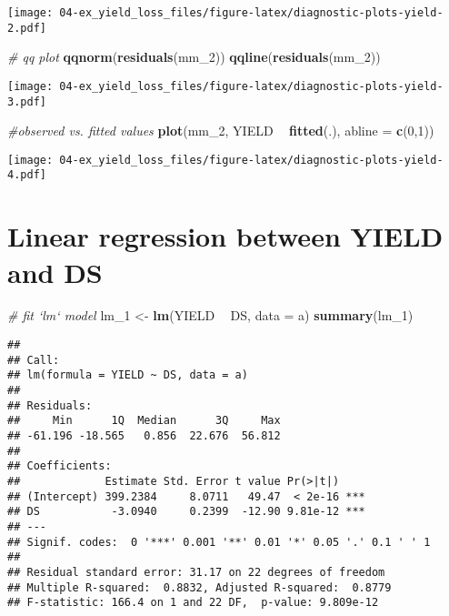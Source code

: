 \documentclass[]{book}
\newenvironment{Shaded}{\begin{snugshade}}{\end{snugshade}}
\newcommand{\CommentTok}[1]{\textcolor[rgb]{0.56,0.35,0.01}{\textit{#1}}}
\newcommand{\DataTypeTok}[1]{\textcolor[rgb]{0.13,0.29,0.53}{#1}}
\newcommand{\DecValTok}[1]{\textcolor[rgb]{0.00,0.00,0.81}{#1}}
\newcommand{\KeywordTok}[1]{\textcolor[rgb]{0.13,0.29,0.53}{\textbf{#1}}}
\newcommand{\NormalTok}[1]{#1}
\newcommand{\OperatorTok}[1]{\textcolor[rgb]{0.81,0.36,0.00}{\textbf{#1}}}
\newcommand{\StringTok}[1]{\textcolor[rgb]{0.31,0.60,0.02}{#1}}
\begin{document}
\texttt{[image: 04-ex\_yield\_loss\_files/figure-latex/diagnostic-plots-yield-2.pdf]}

\begin{Shaded}
\begin{Highlighting}[]
\CommentTok{# qq plot}
\KeywordTok{qqnorm}\NormalTok{(}\KeywordTok{residuals}\NormalTok{(mm_}\DecValTok{2}\NormalTok{))}
\KeywordTok{qqline}\NormalTok{(}\KeywordTok{residuals}\NormalTok{(mm_}\DecValTok{2}\NormalTok{))}
\end{Highlighting}
\end{Shaded}

\texttt{[image: 04-ex\_yield\_loss\_files/figure-latex/diagnostic-plots-yield-3.pdf]}

\begin{Shaded}
\begin{Highlighting}[]
\CommentTok{#observed vs. fitted values}
\KeywordTok{plot}\NormalTok{(mm_}\DecValTok{2}\NormalTok{, YIELD }\OperatorTok{~}\StringTok{ }\KeywordTok{fitted}\NormalTok{(.), }\DataTypeTok{abline =} \KeywordTok{c}\NormalTok{(}\DecValTok{0}\NormalTok{,}\DecValTok{1}\NormalTok{))}
\end{Highlighting}
\end{Shaded}

\texttt{[image: 04-ex\_yield\_loss\_files/figure-latex/diagnostic-plots-yield-4.pdf]}

\hypertarget{linear-regression-between-yield-and-ds}{%
\section{Linear regression between YIELD and DS}\label{linear-regression-between-yield-and-ds}}

\begin{Shaded}
\begin{Highlighting}[]
\CommentTok{# fit `lm` model}
\NormalTok{lm_}\DecValTok{1}\NormalTok{ <-}\StringTok{ }\KeywordTok{lm}\NormalTok{(YIELD }\OperatorTok{~}\StringTok{ }\NormalTok{DS, }\DataTypeTok{data =}\NormalTok{ a) }
\KeywordTok{summary}\NormalTok{(lm_}\DecValTok{1}\NormalTok{)}
\end{Highlighting}
\end{Shaded}

\begin{verbatim}
## 
## Call:
## lm(formula = YIELD ~ DS, data = a)
## 
## Residuals:
##     Min      1Q  Median      3Q     Max 
## -61.196 -18.565   0.856  22.676  56.812 
## 
## Coefficients:
##             Estimate Std. Error t value Pr(>|t|)    
## (Intercept) 399.2384     8.0711   49.47  < 2e-16 ***
## DS           -3.0940     0.2399  -12.90 9.81e-12 ***
## ---
## Signif. codes:  0 '***' 0.001 '**' 0.01 '*' 0.05 '.' 0.1 ' ' 1
## 
## Residual standard error: 31.17 on 22 degrees of freedom
## Multiple R-squared:  0.8832, Adjusted R-squared:  0.8779 
## F-statistic: 166.4 on 1 and 22 DF,  p-value: 9.809e-12
\end{verbatim}
\end{document}
